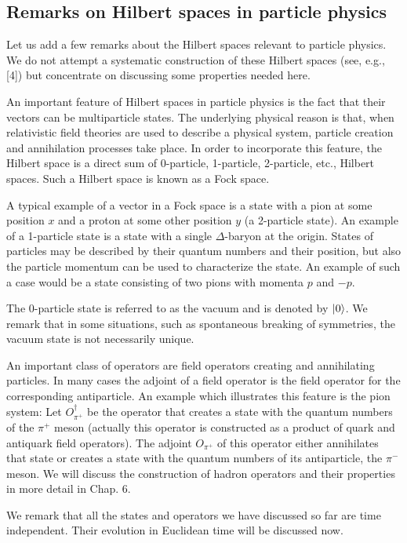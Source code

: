 \subsection{Remarks on Hilbert spaces in particle physics}

Let us add a few remarks about the Hilbert spaces relevant to particle physics.
We do not attempt a systematic construction of these Hilbert spaces (see, e.g.,
[4]) but concentrate on discussing some properties needed here.

An important feature of Hilbert spaces in particle physics is the fact that
their vectors can be multiparticle states. The underlying physical reason is
that, when relativistic field theories are used to describe a physical system,
particle creation and annihilation processes take place. In order to
incorporate this feature, the Hilbert space is a direct sum of 0-particle,
1-particle, 2-particle, etc., Hilbert spaces. Such a Hilbert space is known as
a Fock space.

A typical example of a vector in a Fock space is a state with a pion at some
position $x$ and a proton at some other position $y$ (a 2-particle state). An
example of a 1-particle state is a state with a single $\Delta$-baryon at the
origin. States of particles may be described by their quantum numbers and their
position, but also the particle momentum can be used to characterize the state.
An example of such a case would be a state consisting of two pions with momenta
$p$ and $-p$.

The 0-particle state is referred to as the vacuum and is denoted by $|0\rangle$.
We remark that in some situations, such as spontaneous breaking of symmetries,
the vacuum state is not necessarily unique.

An important class of operators are field operators creating and annihilating
particles. In many cases the adjoint of a field operator is the field operator
for the corresponding antiparticle. An example which illustrates this feature
is the pion system: Let $O_{\pi^+}^\dagger$ be the operator that creates a
state with the quantum numbers of the $\pi^+$ meson (actually this operator is
constructed as a product of quark and antiquark field operators). The adjoint
$O_{\pi^+}$ of this operator either annihilates that state or creates a state
with the quantum numbers of its antiparticle, the $\pi^-$ meson. We will
discuss the construction of hadron operators and their properties in more
detail in Chap. 6.

We remark that all the states and operators we have discussed so far are time
independent. Their evolution in Euclidean time will be discussed now.

